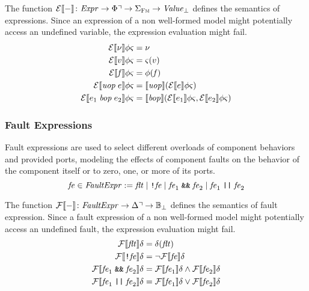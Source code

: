\documentclass[a4paper,10pt,english]{article}
\begin{document}
The function $\mathcal{E} \llbracket - \rrbracket \colon \mathit{Expr} \rightarrow \Phi\urcorner \rightarrow \Sigma_\textsc{Fm} \rightarrow \mathit{Value}_\bot$ defines the
semantics of expressions. Since an expression of a non well-formed model might potentially access an undefined variable, the expression
evaluation might fail. 
\begin{align*}
	\mathcal{E} \llbracket \nu \rrbracket \phi \varsigma &= \nu \\
	\mathcal{E} \llbracket v \rrbracket \phi \varsigma &= \varsigma(v) \\
	\mathcal{E} \llbracket \mathit{f} \rrbracket \phi \varsigma &= \phi(\mathit{f}) \\
	\mathcal{E} \llbracket \mathit{uop}\; e \rrbracket \phi \varsigma &= \llbracket \mathit{uop} \rrbracket (\mathcal{E} \llbracket e \rrbracket \phi
	\varsigma) \\
	\mathcal{E} \llbracket e_1 \;\mathit{bop}\; e_2 \rrbracket \phi \varsigma &= \llbracket \mathit{bop} \rrbracket
	(\mathcal{E} \llbracket e_1 \rrbracket \phi \varsigma, \mathcal{E} \llbracket e_2 \rrbracket \phi \varsigma)
\end{align*}

\subsubsection{Fault Expressions}
Fault expressions are used to select different overloads of component behaviors and provided ports, modeling the effects of
component faults on the behavior of the component itself or to zero, one, or more of its ports.
\begin{equation*}
	\mathit{fe} \in \mathit{FaultExpr} := \mathit{flt} \mid \texttt{!} \mathit{fe} \mid
	\mathit{fe}_1 \; \texttt{\&\&} \; \mathit{fe}_2
	\mid \mathit{fe}_1 \; \texttt{||} \; \mathit{fe}_2
\end{equation*}

The function $\mathcal{F} \llbracket - \rrbracket \colon \mathit{FaultExpr} \rightarrow \Delta\urcorner \rightarrow \mathbb{B}_\bot$ defines the
semantics of fault expression. Since a fault expression of a non well-formed model might potentially access an undefined fault,
the expression evaluation might fail.
\begin{align*}
	\mathcal{F} \llbracket \mathit{flt} \rrbracket \delta &= \delta(\mathit{flt}) \\
	\mathcal{F} \llbracket \texttt{!} \mathit{fe} \rrbracket \delta &= \neg \mathcal{F} \llbracket \mathit{fe} \rrbracket \delta \\
	\mathcal{F} \llbracket \mathit{fe}_1 \; \texttt{\&\&} \; \mathit{fe}_2 \rrbracket \delta &= \mathcal{F} \llbracket \mathit{fe}_1 \rrbracket \delta \wedge
	\mathcal{F} \llbracket \mathit{fe}_2 \rrbracket \delta \\
	\mathcal{F} \llbracket \mathit{fe}_1 \; \texttt{||} \; \mathit{fe}_2 \rrbracket \delta &= \mathcal{F} \llbracket \mathit{fe}_1 \rrbracket \delta \vee
	\mathcal{F} \llbracket \mathit{fe}_2 \rrbracket \delta
\end{align*}
\end{document}
